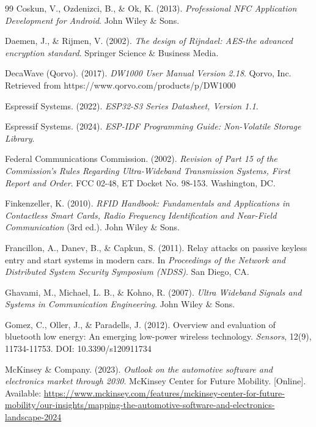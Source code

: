 \begin{thebibliography}{99}
Coskun, V., Ozdenizci, B., \& Ok, K. (2013). \textit{Professional NFC Application Development for Android}. John Wiley \& Sons.

Daemen, J., \& Rijmen, V. (2002). \textit{The design of Rijndael: AES-the advanced encryption standard}. Springer Science \& Business Media.

DecaWave (Qorvo). (2017). \textit{DW1000 User Manual Version 2.18}. Qorvo, Inc. Retrieved from https://www.qorvo.com/products/p/DW1000

Espressif Systems. (2022). \textit{ESP32-S3 Series Datasheet, Version 1.1}.

Espressif Systems. (2024). \textit{ESP-IDF Programming Guide: Non-Volatile Storage Library}.

Federal Communications Commission. (2002). \textit{Revision of Part 15 of the Commission's Rules Regarding Ultra-Wideband Transmission Systems, First Report and Order}. FCC 02-48, ET Docket No. 98-153. Washington, DC.

Finkenzeller, K. (2010). \textit{RFID Handbook: Fundamentals and Applications in Contactless Smart Cards, Radio Frequency Identification and Near-Field Communication} (3rd ed.). John Wiley \& Sons.

Francillon, A., Danev, B., \& Capkun, S. (2011). Relay attacks on passive keyless entry and start systems in modern cars. In \textit{Proceedings of the Network and Distributed System Security Symposium (NDSS)}. San Diego, CA.

Ghavami, M., Michael, L. B., \& Kohno, R. (2007). \textit{Ultra Wideband Signals and Systems in Communication Engineering}. John Wiley \& Sons.

Gomez, C., Oller, J., \& Paradells, J. (2012). Overview and evaluation of bluetooth low energy: An emerging low-power wireless technology. \textit{Sensors}, 12(9), 11734-11753. DOI: 10.3390/s120911734

McKinsey \& Company. (2023). \textit{Outlook on the automotive software and electronics market through 2030}. McKinsey Center for Future Mobility. [Online]. Available: \url{https://www.mckinsey.com/features/mckinsey-center-for-future-mobility/our-insights/mapping-the-automotive-software-and-electronics-landscape-2024}


\end{thebibliography}
